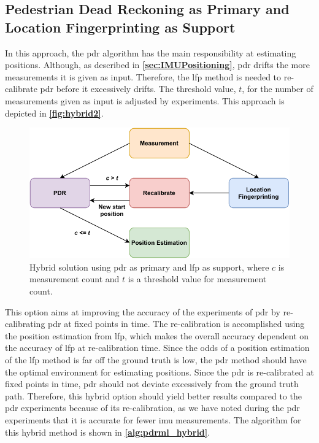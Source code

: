 \subsection{Pedestrian Dead Reckoning as Primary and Location Fingerprinting as Support}
In this approach, the \gls{pdr} algorithm has the main responsibility at estimating positions. Although, as described in \textbf{\autoref{sec:IMUPositioning}}, \gls{pdr} drifts the more measurements it is given as input. Therefore, the \gls{lfp} method is needed to re-calibrate \gls{pdr} before it excessively drifts. The threshold value, $t$, for the number of measurements given as input is adjusted by experiments. This approach is depicted in \textbf{\autoref{fig:hybrid2}}.

\begin{figure}[H]
    \centering
    \includegraphics[scale=0.85]{Images/Experiments/hybrid/approach2.pdf}
    \caption{Hybrid solution using \gls{pdr} as primary and \gls{lfp} as support, where $c$ is measurement count and $t$ is a threshold value for measurement count.}
     \label{fig:hybrid2}
\end{figure}

This option aims at improving the accuracy of the experiments of \gls{pdr} by re-calibrating \gls{pdr} at fixed points in time. The re-calibration is accomplished using the position estimation from \gls{lfp}, which makes the overall accuracy dependent on the accuracy of \gls{lfp} at re-calibration time.
Since the odds of a position estimation of the \gls{lfp} method is far off the ground truth is low, the \gls{pdr} method should have the optimal environment for estimating positions. Since the \gls{pdr} is re-calibrated at fixed points in time, \gls{pdr} should not deviate excessively from the ground truth path. Therefore, this hybrid option should yield better results compared to the \gls{pdr} experiments because of its re-calibration, as we have noted during the \gls{pdr} experiments that it is accurate for fewer \gls{imu} measurements. The algorithm for this hybrid method is shown in \textbf{\autoref{alg:pdrml_hybrid}}.

